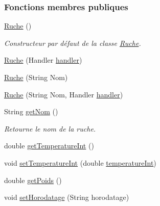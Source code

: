 \subsubsection*{Fonctions membres publiques}
\begin{DoxyCompactItemize}
\item 
\hyperlink{classfr_1_1campus_1_1laurainc_1_1honeybee_1_1_ruche_a56ec53516e4f94b4f5e42f083fa345db}{Ruche} ()
\begin{DoxyCompactList}\small\item\em Constructeur par défaut de la classe \hyperlink{classfr_1_1campus_1_1laurainc_1_1honeybee_1_1_ruche}{Ruche}. \end{DoxyCompactList}\item 
\hyperlink{classfr_1_1campus_1_1laurainc_1_1honeybee_1_1_ruche_abb08f6c820fe60fd569bfabc8207ee94}{Ruche} (Handler \hyperlink{classfr_1_1campus_1_1laurainc_1_1honeybee_1_1_ruche_a9689ca454694434549e5fffca876ffae}{handler})
\item 
\hyperlink{classfr_1_1campus_1_1laurainc_1_1honeybee_1_1_ruche_a969fe0f6a0e3176a86b498306dc7f0b0}{Ruche} (String Nom)
\item 
\hyperlink{classfr_1_1campus_1_1laurainc_1_1honeybee_1_1_ruche_aff527933af3d38ecba47d712d83163d2}{Ruche} (String Nom, Handler \hyperlink{classfr_1_1campus_1_1laurainc_1_1honeybee_1_1_ruche_a9689ca454694434549e5fffca876ffae}{handler})
\item 
String \hyperlink{classfr_1_1campus_1_1laurainc_1_1honeybee_1_1_ruche_a0db4200faed3952a50f63fa7634be39b}{get\+Nom} ()
\begin{DoxyCompactList}\small\item\em Retourne le nom de la ruche. \end{DoxyCompactList}\item 
double \hyperlink{classfr_1_1campus_1_1laurainc_1_1honeybee_1_1_ruche_aca5e489525d7f0cba7741a0d1803c5e5}{get\+Temperature\+Int} ()
\item 
void \hyperlink{classfr_1_1campus_1_1laurainc_1_1honeybee_1_1_ruche_a4bed1041019b54d79beb46d36aae0adb}{set\+Temperature\+Int} (double \hyperlink{classfr_1_1campus_1_1laurainc_1_1honeybee_1_1_ruche_aa8c8bbb640a5e445ca1d67f97e0f99b0}{temperature\+Int})
\item 
double \hyperlink{classfr_1_1campus_1_1laurainc_1_1honeybee_1_1_ruche_a1dce2bd8e8de34d082abd36eab6693d3}{get\+Poids} ()
\item 
void \hyperlink{classfr_1_1campus_1_1laurainc_1_1honeybee_1_1_ruche_ae6a0d7783c6d429a28f1513201928909}{set\+Horodatage} (String horodatage)

\end{DoxyCompactItemize}
